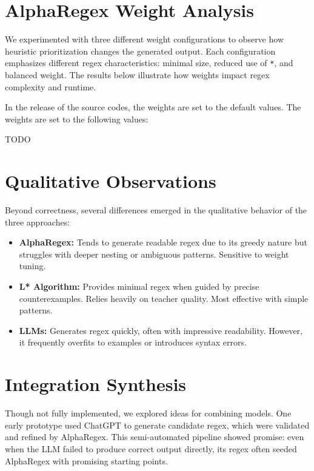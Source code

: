\section{AlphaRegex Weight Analysis}

\indent\indent We experimented with three different weight configurations to observe how heuristic prioritization changes the generated output. Each configuration emphasizes different regex characteristics: minimal size, reduced use of \texttt{*}, and balanced weight. The results below illustrate how weights impact regex complexity and runtime.

In the release of the source codes, the weights are set to the default values. The weights are set to the following values:

TODO 

\section{Qualitative Observations}

\indent\indent Beyond correctness, several differences emerged in the qualitative behavior of the three approaches:

\begin{itemize}
\item \textbf{AlphaRegex:} Tends to generate readable regex due to its greedy nature but struggles with deeper nesting or ambiguous patterns. Sensitive to weight tuning.
\item \textbf{L* Algorithm:} Provides minimal regex when guided by precise counterexamples. Relies heavily on teacher quality. Most effective with simple patterns.
\item \textbf{LLMs:} Generates regex quickly, often with impressive readability. However, it frequently overfits to examples or introduces syntax errors.
\end{itemize}

\section{Integration Synthesis}

\indent\indent Though not fully implemented, we explored ideas for combining models. One early prototype used ChatGPT to generate candidate regex, which were validated and refined by AlphaRegex. This semi-automated pipeline showed promise: even when the LLM failed to produce correct output directly, its regex often seeded AlphaRegex with promising starting points.


